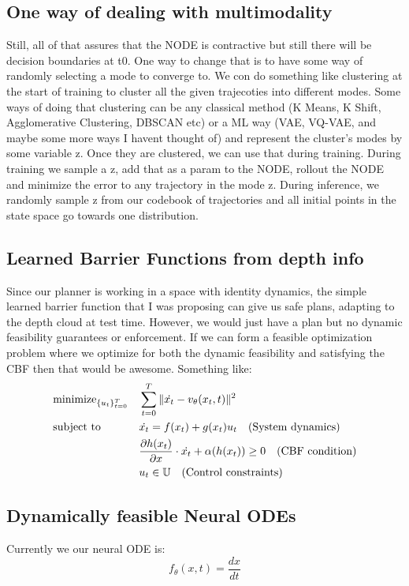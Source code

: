 \documentclass[12pt]{article}
\begin{document}
\subsection{One way of dealing with multimodality}
Still, all of that assures that the NODE is contractive but still there will be decision boundaries at t0. One way to change that is to have some way of randomly selecting a mode to converge to. We con do something like clustering at the start of training to cluster all the given trajecoties into different modes.
Some ways of doing that clustering can be any classical method (K Means, K Shift, Agglomerative Clustering, DBSCAN etc) or a ML way (VAE, VQ-VAE, and maybe some more ways I havent thought of) and represent the cluster's modes by some variable z. Once they are clustered, we can use that during training. During training we 
sample a z, add that as a param to the NODE, rollout the NODE and minimize the error to any trajectory in the mode z. During inference, we randomly sample z from our codebook of trajectories and all initial points in the state space go towards one distribution.

\subsection{Learned Barrier Functions from depth info}
Since our planner is working in a space with identity dynamics, the simple learned barrier function that I was proposing can give us safe plans, adapting to the depth cloud at test time. However, we would just have a plan but no dynamic feasibility guarantees or enforcement. If we can form a feasible optimization problem where we optimize for both the dynamic feasibility and satisfying the CBF then that would be awesome. 
Something like:
\[
\begin{aligned}
    &\text{minimize}_{\{u_t\}_{t=0}^T} && \sum_{t=0}^{T} \|\dot{x_{t}} - v_{\theta}(x_{t}, t)\|^2 \notag \\
    &\text{subject to} && \dot{x_{t}} = f(x_{t}) + g(x_{t})u_{t} \quad \text{(System dynamics)} \notag \\
    &&& \frac{\partial h(x_{t})}{\partial x} \cdot \dot{x_{t}} + \alpha(h(x_{t})) \geq 0 \quad \text{(CBF condition)} \notag \\
    &&& u_{t} \in \mathbb{U} \quad \text{(Control constraints)} \notag \\
\end{aligned}
\]

\subsection{Dynamically feasible Neural ODEs}
Currently we our neural ODE is: \[f_\theta(x, t) = \frac{dx}{dt}\]
\end{document}
